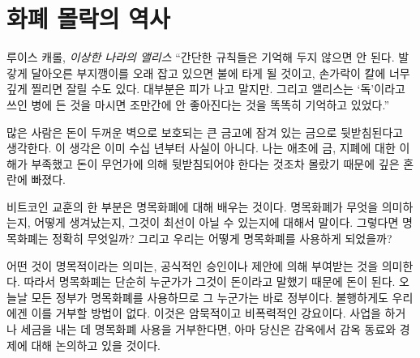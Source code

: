 \chapter{화폐 몰락의 역사}
\label{les:12}

\begin{chapquote}{루이스 캐롤, \textit{이상한 나라의 앨리스}}
\enquote{간단한 규칙들은 기억해 두지 않으면 안 된다.
	 발갛게 달아오른 부지깽이를 오래 잡고 있으면 불에 타게 될 것이고, 
	 손가락이 칼에 너무 깊게 찔리면 잘릴 수도 있다. 
	 대부분은 피가 나고 말지만. 
	 그리고 앨리스는 ‘독’이라고 쓰인 병에 든 것을 마시면 
	 조만간에 안 좋아진다는 것을 똑똑히 기억하고 있었다.}
\end{chapquote}

\begin{comment}
Many people think that money is backed by gold, which is locked away in
big vaults, protected by thick
walls. This ceased to be true many decades ago. I am not sure what I
thought, since I was in much deeper trouble, having virtually no
understanding of gold, paper money, or why it would need to be backed by
something in the first place.
\end{comment}
많은 사람은 돈이 두꺼운 벽으로 보호되는 큰 금고에 잠겨 있는 금으로 뒷받침된다고 생각한다. 
이 생각은 이미 수십 년부터 사실이 아니다.
나는 애초에 금, 지폐에 대한 이해가 부족했고
돈이 무언가에 의해 뒷받침되어야 한다는 것조차 몰랐기 때문에 깊은 혼란에 빠졌다.
\begin{comment}
One part of learning about Bitcoin is learning about fiat money: what it
means, how it came to be, and why it might not be the best idea we ever
had. So, what exactly is fiat money? And how did we end up using it?
\end{comment}
비트코인 교훈의 한 부분은 명목화폐에 대해 배우는 것이다. 
명목화폐가 무엇을 의미하는지, 어떻게 생겨났는지, 
그것이 최선이 아닐 수 있는지에 대해서 말이다. 
그렇다면 명목화폐는 정확히 무엇일까? 
그리고 우리는 어떻게 명목화폐를 사용하게 되었을까?

\begin{comment}
If something is imposed by \textit{fiat}, it simply means that it is imposed by
formal authorization or proposition. Thus, fiat money is money simply
because \textit{someone} says that it is money. Since all governments use fiat
currency today, this someone is \textit{your} government. Unfortunately, you
are not \textit{free} to disagree with this value proposition. You will quickly
feel that this proposition is everything but non-violent. If you refuse
to use this paper currency to do business and pay taxes the only people
you will be able to discuss economics with will be your cellmates.
\end{comment}
어떤 것이 명목적이라는 의미는, 공식적인 승인이나 제안에 의해 부여받는 것을 의미한다. 
따라서 명목화폐는 단순히 누군가가 그것이 돈이라고 말했기 때문에 돈이 된다. 
오늘날 모든 정부가 명목화폐를 사용하므로 그 누군가는 바로 정부이다. 
불행하게도 우리에겐 이를 거부할 방법이 없다.
이것은 암묵적이고 비폭력적인 강요이다.
사업을 하거나 세금을 내는 데 명목화폐 사용을 거부한다면,
아마 당신은 감옥에서 감옥 동료와 경제에 대해 논의하고 있을 것이다.


